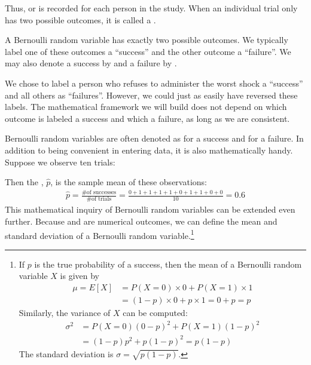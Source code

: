 Thus,  or  is recorded for each person in the study. When an individual trial only has two possible outcomes, it is called a .

\begin{termBox}{
A Bernoulli random variable has exactly two possible outcomes. We typically label one of these outcomes a ``success'' and the other outcome a ``failure''. We may also denote a success by  and a failure by .}
\end{termBox}

\begin{tipBox}{
We chose to label a person who refuses to administer the worst shock a ``success'' and all others as ``failures''. However, we could just as easily have reversed these labels. The mathematical framework we will build does not depend on which outcome is labeled a success and which a failure, as long as we are consistent.}
\end{tipBox}

Bernoulli random variables are often denoted as  for a success and  for a failure. In addition to being convenient in entering data, it is also mathematically handy. Suppose we observe ten trials:
\begin{center}
         
\end{center}
Then the , $\hat{p}$, is the sample mean of these observations:
\begin{eqnarray*}
\hat{p} = \frac{\text{\# of successes}}{\text{\# of trials}} = \frac{0+1+1+1+1+0+1+1+0+0}{10} = 0.6
\end{eqnarray*}
This mathematical inquiry of Bernoulli random variables can be extended even further. Because  and  are numerical outcomes, we can define the {mean} and {standard deviation} of a Bernoulli random variable.\footnote{If ${p}$ is the true probability of a success, then the mean of a Bernoulli random variable $X$ is given by
\begin{align*}
\mu = E[X] &= P(X=0)\times0 + P(X=1)\times1 \\
	&= (1-p)\times0 + p\times 1 = 0+p = p
\end{align*}
Similarly, the variance of $X$ can be computed:
\begin{align*}
\sigma^2 &= {P(X=0)(0-p)^2 + P(X=1)(1-p)^2} \\
	&= {(1-p)p^2 + p(1-p)^2} = {p(1-p)}
\end{align*}
The standard deviation is $\sigma=\sqrt{p(1-p)}$.}


